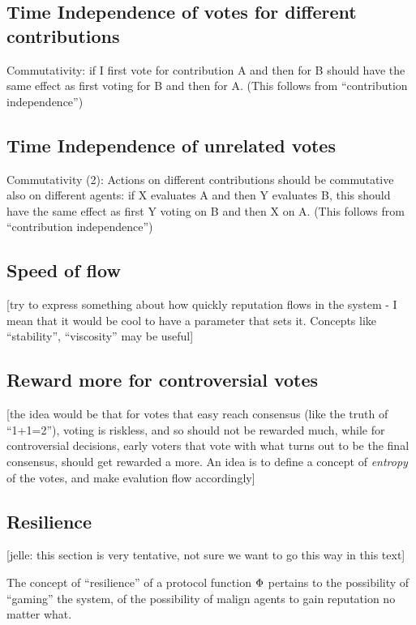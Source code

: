 \documentclass{article}
\begin{document}
\subsection{Time Independence of votes for different contributions}


Commutativity: if I first vote for contribution A and then for B should have the same effect as first voting for B and then for A.
(This follows from ``contribution independence'')

\subsection{Time Independence of unrelated votes}


Commutativity (2): Actions on different contributions should be commutative also on different agents: 
if X evaluates A and then Y evaluates B, this should have the same effect as first Y voting on B and then X on A.
(This follows from ``contribution independence'')

\subsection{Speed of flow}

[try to express something about how quickly reputation flows in the system - I mean that it would be cool to have a parameter that sets it. Concepts like ``stability'', ``viscosity'' may be useful]

\subsection{Reward more for controversial votes}

[the idea would be that for votes that easy reach consensus (like the truth of ``1+1=2''), voting is riskless, and so should not be rewarded much, while for controversial decisions, early voters that vote with what turns out to be the final consensus, should get rewarded a more. An idea is to define a concept of {\em entropy} of the votes, and make evalution flow accordingly]

\subsection{Resilience}

[jelle: this section is very tentative, not sure we want to go this way in this text]

The concept of ``resilience'' of a protocol function $\Phi$ pertains to the possibility of ``gaming'' the system, of the possibility of malign agents to gain reputation no matter what.
\end{document}
